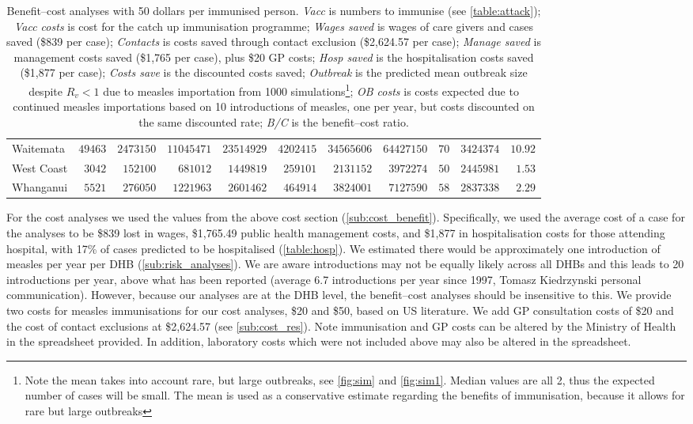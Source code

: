 \documentclass{article}
\begin{document}
\begin{table}
\begin{center}
\begin{tabular}{lrrrrrrrrrr}
Waitemata&$49463$&$2473150$&$11045471$&$23514929$&$4202415$&$34565606$&$64427150$&$ 70$&$3424374$&$10.92$\tabularnewline
West Coast&$ 3042$&$ 152100$&$  681012$&$ 1449819$&$ 259101$&$ 2131152$&$ 3972274$&$ 50$&$2445981$&$ 1.53$\tabularnewline
Whanganui&$ 5521$&$ 276050$&$ 1221963$&$ 2601462$&$ 464914$&$ 3824001$&$ 7127590$&$ 58$&$2837338$&$ 2.29$\tabularnewline
\hline
\end{tabular}\end{center}\caption{Benefit--cost analyses with 50 dollars per immunised person. \textit{Vacc} is numbers to immunise (see \autoref{table:attack}); \textit{Vacc costs} is cost for the catch up immunisation programme; \textit{Wages saved} is wages of care givers and cases saved (\$839 per case); \textit{Contacts} is costs saved through contact exclusion (\$2,624.57 per case); \textit{Manage saved} is management costs saved (\$1,765 per case), plus \$20 GP costs; \textit{Hosp saved} is the hospitalisation costs saved (\$1,877 per case); \textit{Costs save}  is the discounted costs saved; \textit{Outbreak}  is the predicted mean outbreak size despite $R_v < 1$ due to measles importation from 1000 simulations\footnote{Note the mean takes into account rare, but large outbreaks, see \autoref{fig:sim} and \autoref{fig:sim1}. Median values are all 2, thus the expected number of cases will be small. The mean is used as a conservative estimate regarding the benefits of immunisation, because it allows for rare but large outbreaks}; \textit{OB costs}	is costs expected due to continued measles importations based on 10 introductions of measles, one per year, but costs discounted on the same discounted rate; \textit{B/C} is the benefit--cost ratio.}
\label{table:cost50}
\end{table}

For the cost analyses we used the values from the above cost section (\autoref{sub:cost_benefit}). Specifically, we used the average cost of a case for the analyses to be \$839 lost in wages, \$1,765.49 public health management costs, and \$1,877 in hospitalisation costs for those attending hospital, with 17\% of cases predicted to be hospitalised (\autoref{table:hosp}). We estimated there would be approximately one introduction of measles per year per DHB (\autoref{sub:risk_analyses}). We are aware introductions may not be equally likely across all DHBs and this leads to 20 introductions per year, above what has been reported (average 6.7 introductions per year since 1997, Tomasz Kiedrzynski personal communication). However, because our analyses are at the DHB level, the benefit--cost analyses should be insensitive to this. We provide two costs for measles immunisations for our cost analyses, \$20 and \$50, based on US literature. We add GP consultation costs of \$20 and the cost of contact exclusions at \$2,624.57 (see \autoref{sub:cost_res}). Note immunisation and GP costs can be altered by the Ministry of Health in the spreadsheet provided. In addition, laboratory costs which were not included above may also be altered in the spreadsheet.
\end{document}
